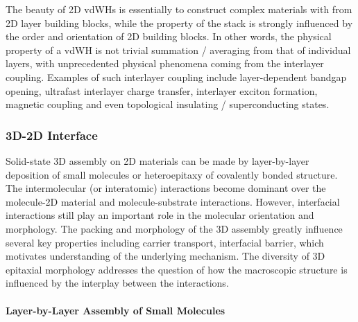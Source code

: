The beauty of 2D vdWHs is essentially to construct complex materials
with from 2D layer building blocks, while the property of the stack is
strongly influenced by the order and orientation of 2D building
blocks.
%
In other words, the physical property of a vdWH is not trivial
summation / averaging from that of individual layers, with
unprecedented physical phenomena coming from the interlayer coupling.
%
Examples of such interlayer coupling include layer-dependent bandgap
opening,  ultra\-fast interlayer charge transfer,
interlayer exciton formation, magnetic coupling and even topological
insulating / superconducting states.


\subsubsection{3D-2D Interface}
\label{sec:intro-3D-2D}

Solid-state 3D assembly on 2D materials can be made by layer-by-layer
deposition of small molecules or hetero\-epitaxy of covalently bonded
structure. The intermolecular (or interatomic) interactions become
dominant over the molecule-2D material and molecule-substrate
interactions. However, interfacial interactions still play an
important role in the molecular orientation and morphology. The
packing and morphology of the 3D assembly greatly influence several
key properties including carrier transport, interfacial barrier, which
motivates understanding of the underlying mechanism.  The diversity of
3D epitaxial morphology addresses the question of how the macroscopic
structure is influenced by the interplay between the interactions.

\paragraph{Layer-by-Layer Assembly of Small Molecules}
\label{sec:org2cdd8f0}

